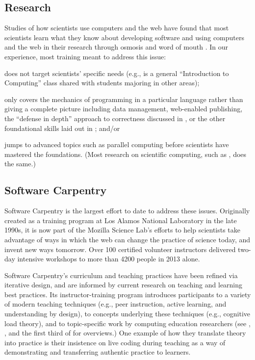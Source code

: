 \documentclass{proposalnsf}
\begin{document}
\subsection{Research}

Studies of how scientists use computers and the web have found that
most scientists learn what they know about developing software and
using computers and the web in their research through osmosis and word
of mouth \cite{hannay2009,prabhu2011}. In our experience, most
training meant to address this issue:

\begin{compactitem}

\item
  does not target scientists' specific needs (e.g., is a general
  ``Introduction to Computing'' class shared with students majoring in
  other areas);

\item
  only covers the mechanics of programming in a particular language
  rather than giving a complete picture including data management,
  web-enabled publishing, the ``defense in depth'' approach to
  correctness discussed in \cite{dubois2005}, or the other
  foundational skills laid out in \cite{wilson2013}; and/or

\item
  jumps to advanced topics such as parallel computing before
  scientists have mastered the foundations.  (Most research on
  scientific computing, such as \cite{hochstein2005}, does the same.)

\end{compactitem}

\subsection{Software Carpentry}

Software Carpentry \cite{swcsite,wilson2012} is the largest effort to
date to address these issues. Originally created as a training program
at Los Alamos National Laboratory in the late 1990s, it is now part of
the Mozilla Science Lab's efforts to help scientists take advantage of
ways in which the web can change the practice of science today, and
invent new ways tomorrow.  Over 100 certified volunteer instructors
delivered two-day intensive workshops to more than 4200 people in 2013
alone.

Software Carpentry's curriculum and teaching practices have been
refined via iterative design, and are informed by current research on
teaching and learning best practices.  Its instructor-training program
\cite{trainingsite} introduces participants to a variety of modern
teaching techniques (e.g., peer instruction, active learning, and
understanding by design), to concepts underlying these techniques
(e.g., cognitive load theory), and to topic-specific work by computing
education researchers (see \cite{guzdial2010}, \cite{hazzan2011}, and
the first third of \cite{sorva2012} for overviews.)  One example of
how they translate theory into practice is their insistence on live
coding during teaching as a way of demonstrating and transferring
authentic practice to learners.
\end{document}
